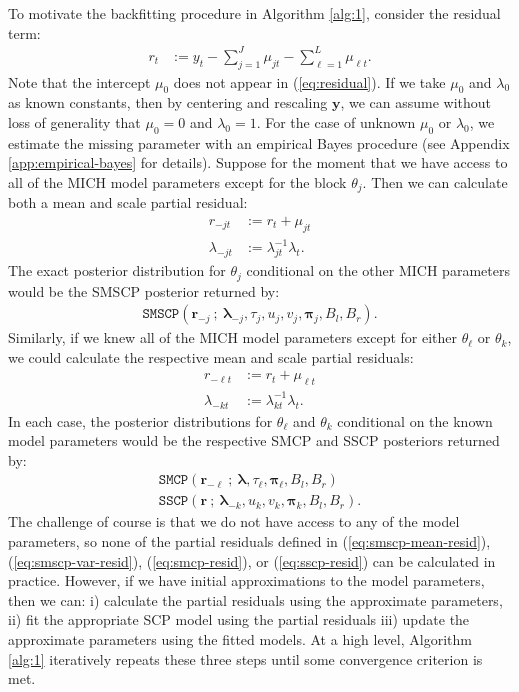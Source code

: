 To motivate the backfitting procedure in Algorithm \ref{alg:1}, consider the residual term:
\begin{align}\label{eq:residual}
    r_t &:= y_t - \sum_{j = 1}^J \mu_{jt}  - \sum_{\ell = 1}^L \mu_{\ell t}.
\end{align}
Note that the intercept $\mu_0$ does not appear in (\ref{eq:residual}). If we take $\mu_0$ and $\lambda_0$ as known constants, then by centering and rescaling $\mathbf{y}$, we can assume without loss of generality that $\mu_0 = 0$ and $\lambda_0=1$. For the case of unknown $\mu_0$ or $\lambda_0$, we estimate the missing parameter with an empirical Bayes procedure (see Appendix \ref{app:empirical-bayes} for details). Suppose for the moment that we have access to all of the MICH model parameters except for the block $\theta_j$. Then we can calculate both a mean and scale partial residual:
\begin{align}
    r_{-jt} &:= r_t + \mu_{jt \label{eq:smscp-mean-resid}} \\
    \lambda_{-jt} &:= \lambda_{jt}^{-1}\lambda_t. \label{eq:smscp-var-resid}
\end{align}
The exact posterior distribution for $\theta_j$ conditional on the other MICH parameters would be the SMSCP posterior returned by:
\begin{align}
    \texttt{SMSCP}(\mathbf{r}_{-j}\:;\: \pmb{\lambda}_{-j}, \tau_j, u_j, v_j, \pmb{\pi}_j, B_l,B_r).
\end{align}
Similarly, if we knew all of the MICH model parameters except for either $\theta_\ell$ or $\theta_k$, we could calculate the respective mean and scale partial residuals: 
\begin{align}
    r_{-\ell t} &:= r_t + \mu_{\ell t} \label{eq:smcp-resid}\\
    \lambda_{-kt} &:= \lambda_{kt}^{-1}\lambda_t. \label{eq:sscp-resid}
\end{align}
In each case, the posterior distributions for $\theta_\ell$ and $\theta_k$ conditional on the known model parameters would be the respective SMCP and SSCP posteriors returned by:
\begin{gather}
    \texttt{SMCP}(\mathbf{r}_{-\ell}\:;\: \pmb{\lambda}, \tau_\ell,\pmb{\pi}_\ell, B_l,B_r) \label{eq:smcp-call} \\
    \texttt{SSCP}(\mathbf{r}\:;\: \pmb{\lambda}_{-k}, u_k,v_k,\pmb{\pi}_k, B_l,B_r). \label{eq:sscp-call}
\end{gather}
The challenge of course is that we do not have access to any of the model parameters, so none of the partial residuals defined in (\ref{eq:smscp-mean-resid}), (\ref{eq:smscp-var-resid}), (\ref{eq:smcp-resid}), or (\ref{eq:sscp-resid}) can be calculated in practice. However, if we have initial approximations to the model parameters, then we can: i) calculate the partial residuals using the approximate parameters, ii) fit the appropriate SCP model using the partial residuals iii) update the approximate parameters using the fitted models. At a high level, Algorithm \ref{alg:1} iteratively repeats these three steps until some convergence criterion is met.

